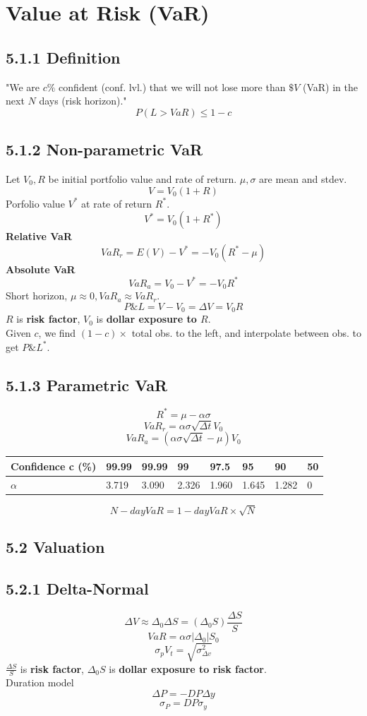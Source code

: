 \section{Value at Risk (VaR)}

\subsection*{5.1.1 Definition}
"We are $c\%$ confident (conf. lvl.) that we will not lose 
more than $\$V$ (VaR) in the next $N$ days (risk horizon)."
\[P(L>VaR) \leq 1-c\]
\subsection*{5.1.2 Non-parametric VaR}
Let $V_0,R$ be initial portfolio value and rate of return.
$\mu,\sigma$ are mean and stdev.
\[V=V_0(1+R)\]
Porfolio value $V^*$ at rate of return $R^*$.
\[V^*=V_0(1+R^*)\]
\textbf{Relative VaR}
\[VaR_r = E(V)-V^*=-V_0(R^*-\mu)\]
\textbf{Absolute VaR}
\[VaR_a=V_0-V^*=-V_0R^*\]
Short horizon, $\mu\approx 0, VaR_a\approx VaR_r$.
\[P\&L=V-V_0=\Delta V=V_0R\]
$R$ is \textbf{risk factor}, $V_0$ is \textbf{dollar exposure to $R$}.\\
Given $c$, we find $(1-c)\times$ total obs. to the left,
and interpolate between obs. to get $P\&L^*$.

\subsection*{5.1.3 Parametric VaR}
\[R^* = \mu-\alpha\sigma\]
\[VaR_r = \alpha\sigma\sqrt{\Delta t} V_0\]
\[VaR_a = (\alpha\sigma\sqrt{\Delta t}-\mu)V_0\]
\begin{table}[]
\begin{tabular}{|l|l|l|l|l|l|l|l|}
\hline
Confidence c (\%) & 99.99 & 99.99 & 99    & 97.5  & 95    & 90    & 50 \\ \hline
$\alpha$          & 3.719 & 3.090 & 2.326 & 1.960 & 1.645 & 1.282 & 0  \\ \hline
\end{tabular}
\end{table}
\[N-day VaR=1-day VaR\times\sqrt{N}\]

\subsection*{5.2 Valuation}
\subsection*{5.2.1 Delta-Normal}
\[\Delta V \approx \Delta_0 \Delta S = (\Delta_0 S)\frac{\Delta S}{S}\]
\[VaR=\alpha\sigma|\Delta_0|S_0\]
\[\sigma_p V_t = \sqrt{\sigma_{\Delta v}^2}\]
$\frac{\Delta S}{S}$ is \textbf{risk factor}, 
$\Delta_0 S$ is \textbf{dollar exposure to risk factor}.\\
Duration model
\[\Delta P = -DP\Delta y\]
\[\sigma_P = DP\sigma_y\]

